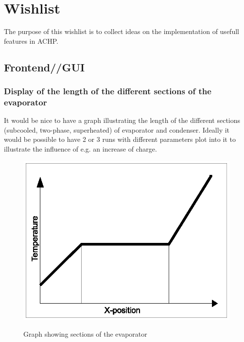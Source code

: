 \documentclass[]{article}
\begin{document}
\section{Wishlist}
The purpose of this wishlist is to collect ideas on the implementation of usefull features in ACHP.

\subsection{Frontend//GUI}
\subsubsection{Display of the length of the different sections of the evaporator}
It would be nice to have a graph illustrating the length of the different sections
(subcooled, two-phase, superheated) of evaporator and condenser. Ideally it would be possible
to have 2 or 3 runs with different parameters plot into it to illustrate the influence
of e.g. an increase of charge.
  
\begin{figure}[htbp]
	\centering
		\includegraphics{wishlist_drawings_section_graph.eps}
	\label{fig:wishlist_drawings_section_graph}
	\caption{Graph showing sections of the evaporator}
\end{figure}
\end{document}

